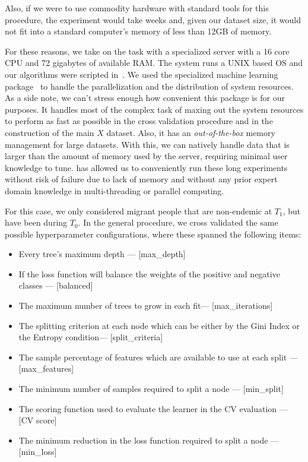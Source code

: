 Also, if we were to use commodity hardware with standard tools for this procedure, the experiment would take weeks and, given our dataset size, it would not fit into a standard computer's memory of less than 12GB of memory.

For these reasons, we take on the task with a specialized server with a 16 core CPU and 72 gigabytes of available RAM.\@
The system runs a UNIX based OS and our algorithms were scripted in~\cite{python3.5}.
We used the specialized machine learning package~\cite{graphlab} to handle the parallelization and the distribution of system resources.
As a side note, we can't stress enough how convenient this package is for our purposes.
It handles most of the complex task of maxing out the system resources to perform as fast as possible in the cross validation procedure and in the construction of the main $X$ dataset.
Also, it has an \textit{out-of-the-box} memory management for large datasets.
With this, we can natively handle data that is larger than the amount of memory used by the server, requiring minimal user knowledge to tune.
\cite{graphlab} has allowed us to conveniently run these long experiments without risk of failure due to lack of memory and without any prior expert domain knowledge in multi-threading or parallel computing.

For this case, we only considered migrant people that are non-endemic at $T_1$, but have been during $T_0$.
In the general procedure, we cross validated the same possible hyperparameter configurations, where these spanned the following items:

\begin{itemize}\label{list:random_forest_grid_search_params}

  \item Every tree's maximum depth --- [max\_depth]
  \item If the loss function will balance the weights of the positive and negative classes --- [balanced]
  \item The maximum number of trees to grow in each fit--- [max\_iterations]
  \item The splitting criterion at each node which can be either by the Gini Index or the Entropy condition--- [split\_criteria]
  \item The sample percentage of features which are available to use at each split --- [max\_features]
  \item The minimum number of samples required to split a node --- [min\_split]
  \item The scoring function used to evaluate the learner in the CV evaluation --- [CV score]
  \item The minimum reduction in the loss function required to split a node  --- [min\_loss]
\end{itemize}


